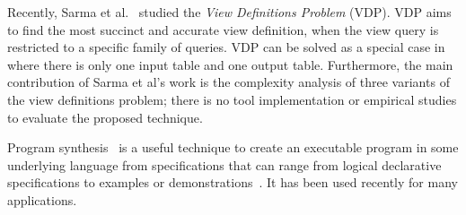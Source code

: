 Recently, Sarma et al.~\cite{DasSarma:2010} studied the \textit{View Definitions Problem} (VDP).
VDP aims to find the most
succinct and accurate view definition, when
the view query is restricted to a specific family of queries.
VDP can be solved as a special case in \ourtool where there is only one
input table and one output table. Furthermore, the main contribution
of Sarma et al's work is the complexity analysis of
three variants of the view definitions problem; there is no
tool implementation or empirical studies to evaluate
the proposed technique.






\vspace{1mm}

Program synthesis~\cite{Gulwani:2010:DPS} is a useful
technique to create an executable program
in some underlying language from specifications that can range
from logical declarative specifications to examples or
demonstrations~\cite{Harris:2011, singh:2012, Gulwani:2011,
Kandel:2011, Fisher08Pads,Lau:2003:PDU, Lau:2000:VSA, Barbosa:2010:MLA, Arasu:2009:LST}.
It has been used recently for many applications.


